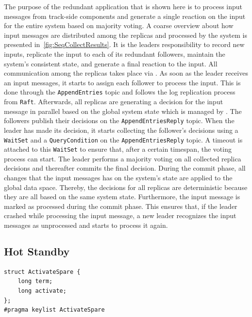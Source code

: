 The purpose of the redundant application that is shown here is to process input messages from track-side components and generate a single reaction on the input for the entire system based on majority voting.
A coarse overview about how input messages are distributed among the replicas and processed by the system is presented in~\autoref{fig:SeqCollectResults}.
It is the leaders responsibility to record new inputs, replicate the input to each of its redundant followers, maintain the system's consistent state, and generate a final reaction to the input.
All communication among the replicas takes place via .
As soon as the leader receives an input messages, it starts to assign each follower to process the input.
This is done through the \texttt{AppendEntries} topic and follows the log replication process from \texttt{Raft}.
Afterwards, all replicas are generating a decision for the input message in parallel based on the global system state which is managed by .
The followers publish their decisions on the \texttt{AppendEntriesReply} topic.
When the leader has made its decision, it starts collecting the follower's decisions using a \texttt{WaitSet} and a \texttt{QueryCondition} on the \texttt{AppendEntriesReply} topic.
A timeout is attached to this \texttt{WaitSet} to ensure that, after a certain timespan, the voting process can start.
The leader performs a majority voting on all collected replica decisions and thereafter commits the final decision.
During the commit phase, all changes that the input messages has on the system's state are applied to the global data space.
Thereby, the decisions for all replicas are deterministic because they are all based on the same system state.
Furthermore, the input message is marked as processed during the commit phase.
This ensures that, if the leader crashed while processing the input message, a new leader recognizes the input messages as unprocessed and starts to process it again.


\subsection{Hot Standby}
\begin{lstlisting}[caption={\abr{IDL} definition for the \texttt{ActivateSpare} topic. This topic is used to activate or deactivate spare replicas. The \texttt{term} field encodes the term in which the activate or deactivate call has been made and \texttt{activate} gets interpreted as a boolean that encodes whether the spare should be activated or deactivated.}, label=code:activateSpare]
struct ActivateSpare {
    long term;
    long activate;
};
#pragma keylist ActivateSpare
\end{lstlisting}

